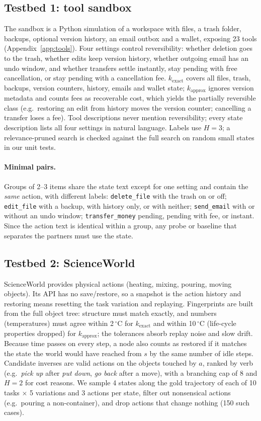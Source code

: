 \documentclass[11pt]{article}
\begin{document}
\subsection{Testbed 1: tool sandbox}
The sandbox is a Python simulation of a workspace with files, a trash folder, backups, optional version history,
an email outbox and a wallet, exposing 23 tools (Appendix~\ref{app:tools}). Four settings control
reversibility: whether deletion goes to the trash, whether edits keep version history, whether outgoing email has
an undo window, and whether transfers settle instantly, stay pending with free cancellation, or stay pending with a
cancellation fee. $k_{\text{exact}}$ covers all files, trash, backups, version counters, history, emails and wallet
state; $k_{\text{approx}}$ ignores version metadata and counts fees as recoverable cost, which yields the
partially reversible class (e.g.\ restoring an edit from history moves the version counter; cancelling a transfer
loses a fee). Tool descriptions never mention reversibility; every state description lists all four settings in
natural language. Labels use $H=3$; a relevance-pruned search is checked against the full search on random small
states in our unit tests.

\paragraph{Minimal pairs.} Groups of 2--3 items share the state text except for one setting and contain the
\emph{same} action, with different labels: \texttt{delete\_file} with the trash on or off;
\texttt{edit\_file} with a backup, with history only, or with neither; \texttt{send\_email} with or without an undo
window; \texttt{transfer\_money} pending, pending with fee, or instant. Since the action text is identical within a
group, any probe or baseline that separates the partners must use the state.

\subsection{Testbed 2: ScienceWorld}
ScienceWorld \citep{wang2022scienceworld} provides physical actions (heating, mixing, pouring, moving objects). Its
API has no save/restore, so a snapshot is the action history and restoring means resetting the task variation and
replaying. Fingerprints are built from the full object tree: structure must match exactly, and numbers
(temperatures) must agree within 2\,$^\circ$C for $k_{\text{exact}}$ and within 10\,$^\circ$C (life-cycle
properties dropped) for $k_{\text{approx}}$; the tolerances absorb replay noise and slow drift. Because time passes
on every step, a node also counts as restored if it matches the state the world would have reached from $s$ by the
same number of idle steps. Candidate inverses are valid actions on the objects touched by $a$, ranked by verb
(e.g.\ \emph{pick up} after \emph{put down}, \emph{go back} after a move), with a branching cap of 8 and $H=2$
for cost reasons. We sample 4 states along the gold trajectory of each of 10 tasks $\times$ 5 variations and 3
actions per state, filter out nonsensical actions (e.g.\ pouring a non-container), and drop actions that change
nothing (150 such cases).
\end{document}
